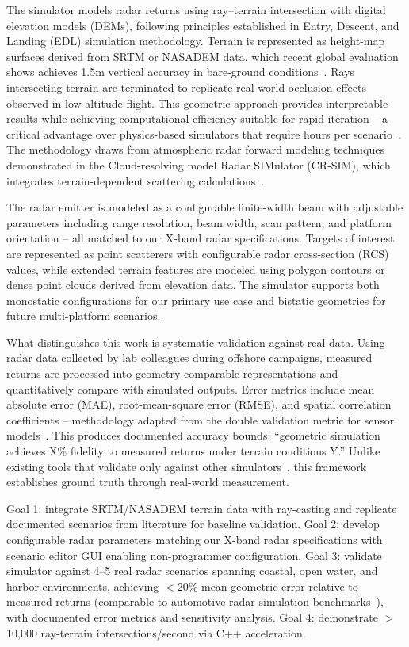 \documentclass[12pt]{article}
\newcommand{\sect}[1]{\noindent{\color{garnet}\textbf{\textsc{#1}}.}}
\newcommand{\subsect}[1]{\noindent{\color{garnet}\textit{#1.}}}
\begin{document}
\sect{Research Methods} The simulator models radar returns using ray--terrain intersection with digital elevation models (DEMs), following principles established in Entry, Descent, and Landing (EDL) simulation methodology. Terrain is represented as height-map surfaces derived from SRTM or NASADEM data, which recent global evaluation shows achieves 1.5m vertical accuracy in bare-ground conditions~\cite{simard2024dem}. Rays intersecting terrain are terminated to replicate real-world occlusion effects observed in low-altitude flight. This geometric approach provides interpretable results while achieving computational efficiency suitable for rapid iteration -- a critical advantage over physics-based simulators that require hours per scenario~\cite{mock2024radarays}. The methodology draws from atmospheric radar forward modeling techniques demonstrated in the Cloud-resolving model Radar SIMulator (CR-SIM), which integrates terrain-dependent scattering calculations~\cite{oue2020crsim}.

The radar emitter is modeled as a configurable finite-width beam with adjustable parameters including range resolution, beam width, scan pattern, and platform orientation -- all matched to our X-band radar specifications. Targets of interest are represented as point scatterers with configurable radar cross-section (RCS) values, while extended terrain features are modeled using polygon contours or dense point clouds derived from elevation data. The simulator supports both monostatic configurations for our primary use case and bistatic geometries for future multi-platform scenarios.

\subsect{Validation Framework} What distinguishes this work is systematic validation against real data. Using radar data collected by lab colleagues during offshore campaigns, measured returns are processed into geometry-comparable representations and quantitatively compare with simulated outputs. Error metrics include mean absolute error (MAE), root-mean-square error (RMSE), and spatial correlation coefficients -- methodology adapted from the double validation metric for sensor models~\cite{elster2024dvm}. This produces documented accuracy bounds: ``geometric simulation achieves X\% fidelity to measured returns under terrain conditions Y.'' Unlike existing tools that validate only against other simulators~\cite{rossler2022validation}, this framework establishes ground truth through real-world measurement.

\sect{Goals and Expected Results}
Goal 1: integrate SRTM/NASADEM terrain data with ray-casting and replicate documented scenarios from literature for baseline validation. Goal 2: develop configurable radar parameters matching our X-band radar specifications with scenario editor GUI enabling non-programmer configuration. Goal 3: validate simulator against 4--5 real radar scenarios spanning coastal, open water, and harbor environments, achieving $<$20\% mean geometric error relative to measured returns (comparable to automotive radar simulation benchmarks~\cite{holder2018}), with documented error metrics and sensitivity analysis. Goal 4: demonstrate $>$10,000 ray-terrain intersections/second via C++ acceleration.
\end{document}
